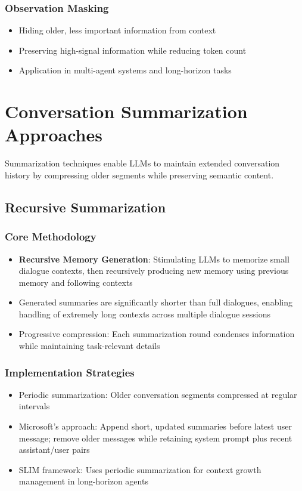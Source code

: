 \documentclass[11pt,letterpaper]{article}
\begin{document}
\subsubsection{Observation Masking}
\begin{itemize}[leftmargin=*]
    \item Hiding older, less important information from context
    \item Preserving high-signal information while reducing token count
    \item Application in multi-agent systems and long-horizon tasks
\end{itemize}

\section{Conversation Summarization Approaches}

Summarization techniques enable LLMs to maintain extended conversation history by compressing older segments while preserving semantic content.

\subsection{Recursive Summarization}

\subsubsection{Core Methodology}
\begin{itemize}[leftmargin=*]
    \item \textbf{Recursive Memory Generation}: Stimulating LLMs to memorize small dialogue contexts, then recursively producing new memory using previous memory and following contexts
    \item Generated summaries are significantly shorter than full dialogues, enabling handling of extremely long contexts across multiple dialogue sessions
    \item Progressive compression: Each summarization round condenses information while maintaining task-relevant details
\end{itemize}

\subsubsection{Implementation Strategies}
\begin{itemize}[leftmargin=*]
    \item Periodic summarization: Older conversation segments compressed at regular intervals
    \item Microsoft's approach: Append short, updated summaries before latest user message; remove older messages while retaining system prompt plus recent assistant/user pairs
    \item SLIM framework: Uses periodic summarization for context growth management in long-horizon agents
\end{itemize}
\end{document}

